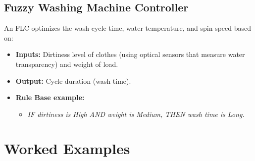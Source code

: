 \documentclass[12pt,a4paper]{article}
\begin{document}
\subsection{Fuzzy Washing Machine Controller}
An FLC optimizes the wash cycle time, water temperature, and spin speed based on:
\begin{itemize}[leftmargin=*, itemsep=3pt]
  \item \textbf{Inputs:} Dirtiness level of clothes (using optical sensors that measure water transparency) and weight of load.
  \item \textbf{Output:} Cycle duration (wash time).
  \item \textbf{Rule Base example:}
    \begin{itemize}[leftmargin=1.5em]
      \item \textit{IF dirtiness is High AND weight is Medium, THEN wash time is Long.}
    \end{itemize}
\end{itemize}

\section{Worked Examples}
\end{document}
